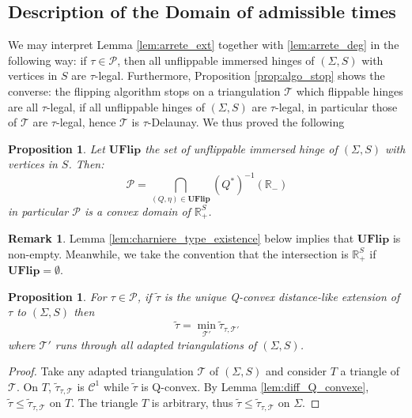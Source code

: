 \documentclass[a4paper,12pt]{article}
\def\TT{\mathcal T}
\def\adm{\P}
\def\RR{\mathbb{R}}
\def\adm{\mathcal{P}}
\def\P{\mathcal{P}}
\newcommand{\tautilde}[2]{\widetilde\tau_{#1,#2}}
\newtheorem{prop}[lem]{Proposition}
\theoremstyle{definition}
\newtheorem*{rem}{Remark}			 %
\begin{document}
						
						

				
					\subsection{Description of the Domain of admissible times}


						We may interpret Lemma \ref{lem:arrete_ext} together with \ref{lem:arrete_deg} in the following way: if $\tau \in \adm$, then all unflippable immersed hinges of $(\Sigma, S)$ with vertices in $S$ are $\tau$-legal. Furthermore, Proposition \ref{prop:algo_stop} shows the converse: the flipping algorithm stops on a triangulation $\TT$ which flippable hinges are all $\tau$-legal, if all unflippable hinges of $(\Sigma, S)$ are $\tau$-legal, in particular those of $\TT$ are $\tau$-legal, hence $\TT$ is $\tau$-Delaunay.
						We thus proved the following


						\begin{prop}\label{prop:domaine_convexe}
						Let $\mathbf{UFlip}$ the set of unflippable immersed hinge of $(\Sigma, S)$ with vertices in $S$. Then:
						 $$\adm = \bigcap_{(Q,\eta)\in \mathbf{UFlip}} (Q^*)^{-1}(\RR_-)$$
						 in particular $\adm$ is a convex domain of $\RR_+^{S}$.
						\end{prop}
						\begin{rem}\label{rem:lemma_lem_charniere_type}
						 Lemma \ref{lem:charniere_type_existence} below implies that $\mathbf{UFlip}$ is non-empty. Meanwhile, we take the convention that the intersection is $\RR_+^S$ if $\mathbf{UFlip} =\emptyset$.
						\end{rem}

						\begin{prop}\label{prop:unique_q_convex_distance_like_extension}
						 For $\tau\in \adm$, if $\widetilde\tau$ is the unique Q-convex distance-like extension of $\tau$ to $(\Sigma, S)$ then
						 $$\widetilde\tau = \min_{\TT'} \tautilde{\tau}{\TT'} $$
						 where $\TT'$ runs through all adapted triangulations of $(\Sigma, S)$.
						\end{prop}
						\begin{proof}
						 Take any adapted triangulation $\TT$ of $(\Sigma, S)$ and consider $T$ a triangle of $\TT$. On $T$, $\tautilde{\tau}{\TT}$ is $\mathscr C^1$ while $\widetilde\tau$ is Q-convex. By Lemma \ref{lem:diff_Q_convexe}, $\widetilde\tau \leq \tautilde{\tau}{\TT}$ on $T$. 
						 The triangle $T$ is arbitrary, thus $\widetilde\tau \leq \tautilde{\tau}{\TT}$ on $\Sigma$. 
						\end{proof}
\end{document}
